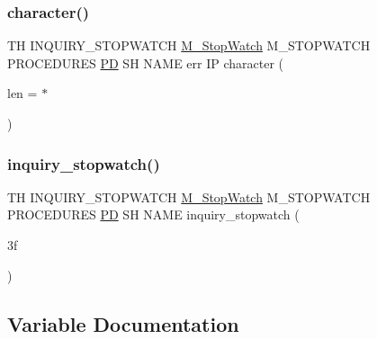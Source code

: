 \subsubsection{\texorpdfstring{character()}{character()}}
{\footnotesize\ttfamily TH I\+N\+Q\+U\+I\+R\+Y\+\_\+\+S\+T\+O\+P\+W\+A\+T\+CH \hyperlink{option__stopwatch_83_8txt_aa2011fc45a5e502e87ee50996a8a9305}{M\+\_\+\+Stop\+Watch} M\+\_\+\+S\+T\+O\+P\+W\+A\+T\+CH P\+R\+O\+C\+E\+D\+U\+R\+ES \hyperlink{what__overview_81_8txt_a85f26da5a4481fbdb0d9c79f2b94de3e}{PD} SH N\+A\+ME err IP character (\begin{DoxyParamCaption}\item[{len}]{ = {\ttfamily $\ast$} }\end{DoxyParamCaption})}

\mbox{\label{inquiry__stopwatch_83_8txt_a4dada9d717f128f440143c7c9e065435}} 
\subsubsection{\texorpdfstring{inquiry\+\_\+stopwatch()}{inquiry\_stopwatch()}}
{\footnotesize\ttfamily TH I\+N\+Q\+U\+I\+R\+Y\+\_\+\+S\+T\+O\+P\+W\+A\+T\+CH \hyperlink{option__stopwatch_83_8txt_aa2011fc45a5e502e87ee50996a8a9305}{M\+\_\+\+Stop\+Watch} M\+\_\+\+S\+T\+O\+P\+W\+A\+T\+CH P\+R\+O\+C\+E\+D\+U\+R\+ES \hyperlink{what__overview_81_8txt_a85f26da5a4481fbdb0d9c79f2b94de3e}{PD} SH N\+A\+ME inquiry\+\_\+stopwatch (\begin{DoxyParamCaption}\item[{3f}]{ }\end{DoxyParamCaption})}



\subsection{Variable Documentation}
\mbox{\label{inquiry__stopwatch_83_8txt_a3a9b41223396c066db320e657bd8cba4}} 
